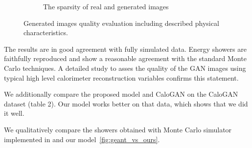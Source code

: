 \begin{figure}
\begin{subfigure}{0.19\textwidth}
    \caption{The sparsity of real and generated images}
  \end{subfigure}
  \caption{Generated images quality evaluation including described physical characteristics.}\label{fig:quality}  
\end{figure}

The results are in good agreement with fully simulated data. Energy showers are faithfully reproduced and show a reasonable agreement with the standard Monte Carlo techniques. A detailed study to asses the quality of the GAN images using typical high level calorimeter reconstruction variables confirms this statement.




We additionally compare the proposed model and CaloGAN on the CaloGAN dataset (table 2). Our model works better on that data, which shows that we did it well.



We qualitatively compare the showers obtained with Monte Carlo simulator implemented in \geant and our model~\cref{fig:geant_vs_ours}.  



